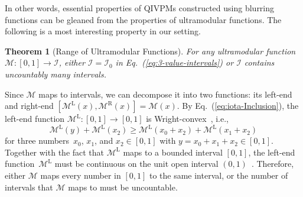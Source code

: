 \documentclass[english,reprint, aps, prl,superscriptaddress, showpacs,
showkeys, longbibliography, amsmath, amssymb, floatfix]{revtex4-1}
\theoremstyle{plain}
\newtheorem{thm}{Theorem}
\theoremstyle{definition}
\newcommand{\ultramodular}{\mathcal{M}}
\newcommand{\ultramodularL}[1][]{\ensuremath{\ultramodular^{\mathrm{L{#1}}}}}
\newcommand{\ultramodularR}[1][]{\ensuremath{\ultramodular^{\mathrm{R{#1}}}}}
\begin{document}
In other words, essential properties of QIVPMs constructed using
blurring functions can be gleaned from the properties of
ultramodular functions. The following is a most interesting property
in our setting. 

\begin{thm}[Range of Ultramodular Functions]\label{thm:convex-uncountable}For
any ultramodular function~$\ultramodular:\left[0,1\right]\rightarrow\mathscr{I}$,
either $\mathscr{I}=\mathscr{I}_{0}$ in Eq.~(\ref{eq:3-value-intervals}) or
$\mathscr{I}$ contains uncountably many intervals.\end{thm}

Since $\ultramodular$ maps to intervals, we can decompose it into
two functions: its left-end and right-end $\left[\ultramodularL\left(x\right),\ultramodularR\left(x\right)\right]=\ultramodular\left(x\right)$.
By Eq.~(\ref{eq:iota-Inclusion}), the left-end function $\ultramodularL:\left[0,1\right]\rightarrow\left[0,1\right]$
is Wright-convex~\citep{Wright1954,RobertsVarberg1973,PecaricTong1992},
i.e., 
\[
\ultramodularL\left(y\right)+\ultramodularL\left(x_{2}\right)\ge\ultramodularL\left(x_{0}+x_{2}\right)+\ultramodularL\left(x_{1}+x_{2}\right)
\]
for three numbers~$x_{0}$, $x_{1}$, and $x_{2}\in\left[0,1\right]$ with
$y=x_{0}+x_{1}+x_{2}\in\left[0,1\right]$. 
Together with the fact that $\ultramodularL$ maps to a bounded
interval $\left[0,1\right]$, the left-end function~$\ultramodularL$
must be continuous on the unit open interval
$\left(0,1\right)$~\citep{MarinacciMontrucchio2005}.  Therefore,
either $\ultramodular$ maps every number in $\left[0,1\right]$ to the
same interval, or the number of intervals that $\ultramodular$ maps to
must be uncountable.
\end{document}
